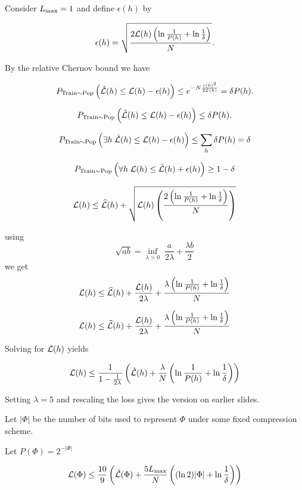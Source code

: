 {Consider $L_{\max} = 1$ and define $\epsilon(h)$ by

\vfill
$$\epsilon(h) = \sqrt{\frac{2{\cal L}(h)\left(\ln\frac{1}{P(h)} + \ln\frac{1}{\delta}\right)}{N}}.$$

\vfill
By the relative Chernov bound we have

\vfill
$$P_{\mathrm{Train} \sim \mathrm{Pop}}\left(\hat{{\cal L}}(h) \leq {\cal L}(h) - \epsilon(h)\right) \leq e^{-N\frac{\epsilon(h)^2}{2{\cal L}(h)}} = \delta P(h).$$


$$P_{\mathrm{Train} \sim \mathrm{Pop}}\left(\hat{{\cal L}}(h) \leq {\cal L}(h) - \epsilon(h)\right) \leq \delta P(h).$$

\vfill
$$P_{\mathrm{Train} \sim \mathrm{Pop}}\left(\exists h\;\hat{{\cal L}}(h) \leq {\cal L}(h) - \epsilon(h)\right) \leq \sum_h \delta P(h) =\delta$$

\vfill
$$P_{\mathrm{Train} \sim \mathrm{Pop}}\left(\forall h\;{\cal L}(h) \leq \hat{{\cal L}}(h) + \epsilon(h)\right) \geq 1- \delta$$


$${\cal L}(h) \leq \widehat{{\cal L}}(h) + \sqrt{{\cal L}(h)\left(\frac{2\left(\ln\frac{1}{P(h)} + \ln\frac{1}{\delta}\right)}{N}\right)}$$

using
$$\sqrt{ab} = \inf_{\lambda > 0}\;\frac{a}{2\lambda} + \frac{\lambda b}{2}$$
\vfill
we get
$${\cal L}(h) \leq \widehat{{\cal L}}(h) + \frac{{\cal L}(h)}{2\lambda} + \frac{\lambda\left(\ln\frac{1}{P(h)} + \ln\frac{1}{\delta}\right)}{N}$$

$${\cal L}(h) \leq \widehat{{\cal L}}(h) + \frac{{\cal L}(h)}{2\lambda} + \frac{\lambda\left(\ln\frac{1}{P(h)} + \ln\frac{1}{\delta}\right)}{N}$$

\vfill
Solving for ${\cal L}(h)$ yields

\vfill
$${\cal L}(h) \leq \frac{1}{1-\frac{1}{2\lambda}}\left(\hat{{\cal L}}(h) + \frac{\lambda}{N}\left(\ln \frac{1}{P(h)} + \ln \frac{1}{\delta}\right)\right)$$

\vfill
Setting $\lambda = 5$ and rescaling the loss gives the version on earlier slides.


Let $|\Phi|$ be the number of bits used to represent $\Phi$ under some fixed compression scheme.

\vfill
Let $P(\Phi) = 2^{-|\Phi|}$

\vfill
    $${\cal L}(\Phi) \leq \frac{10}{9}\left(\hat{\cal L}(\Phi) + \frac{5 L_\mathrm{max}}{N}\left((\ln 2)|\Phi| + \ln\frac{1}{\delta}\right)\right)$$

}
